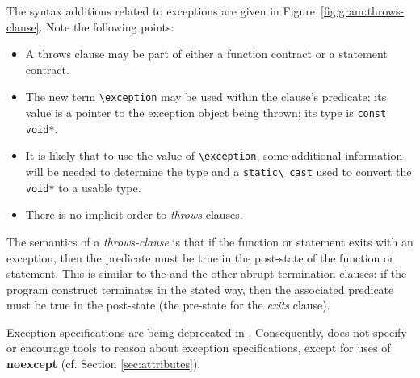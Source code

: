 The syntax additions related to exceptions are given in 
Figure~\ref{fig:gram:throws-clause}. Note the following points:
\begin{itemize}
\item A throws clause may be part of either a function contract or a statement contract.
\item The new term \lstinline|\exception| may be used within the clause's predicate; its value is a pointer to the exception object being thrown; its type is \lstinline|const void*|.
\item It is likely that to use the value of \lstinline|\exception|,
some additional information will be needed to determine the type and a
\lstinline|static\_cast| used to convert the \lstinline|void*| to a 
usable type.
\item There is no implicit order to \textsl{throws} clauses.
\end{itemize}
The semantics of a \textsl{throws-clause} is that if the function or statement exits with an exception, then the predicate must be true in the post-state of the function or statement. This is similar to the \ensures and the other abrupt termination clauses: if the program construct terminates in the stated way, then the associated predicate must be true in the post-state (the pre-state for the \textsl{exits} clause).

Exception specifications are being deprecated in \lang. Consequently, \NAME does not specify or encourage tools to reason about \lang exception specifications, except for  uses of \textbf{noexcept} (cf. Section \ref{sec:attributes}).

